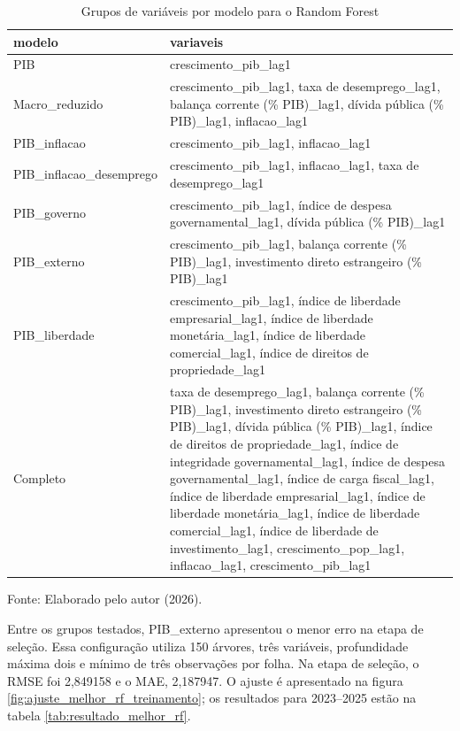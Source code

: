 \begin{table}[htbp]
	\centering
	\captionsetup{justification=centering}
	\caption{Grupos de variáveis por modelo para o Random Forest}
	\label{tab:grupos_rf}
	
	\scriptsize
	\setlength{\tabcolsep}{2pt}
	\renewcommand{\arraystretch}{1.3}
	
	\begin{tabularx}{\textwidth}{>{\RaggedRight\arraybackslash}X>{\RaggedRight\arraybackslash}X}
		\toprule
		modelo & variaveis \\
		\midrule
		PIB & crescimento\_pib\_lag1 \\
		Macro\_reduzido & crescimento\_pib\_lag1, taxa de desemprego\_lag1, balança corrente (\% PIB)\_lag1, dívida pública (\% PIB)\_lag1, inflacao\_lag1 \\
		PIB\_inflacao & crescimento\_pib\_lag1, inflacao\_lag1 \\
		PIB\_inflacao\_desemprego & crescimento\_pib\_lag1, inflacao\_lag1, taxa de desemprego\_lag1 \\
		PIB\_governo & crescimento\_pib\_lag1, índice de despesa governamental\_lag1, dívida pública (\% PIB)\_lag1 \\
		PIB\_externo & crescimento\_pib\_lag1, balança corrente (\% PIB)\_lag1, investimento direto estrangeiro (\% PIB)\_lag1 \\
		PIB\_liberdade & crescimento\_pib\_lag1, índice de liberdade empresarial\_lag1, índice de liberdade monetária\_lag1, índice de liberdade comercial\_lag1, índice de direitos de propriedade\_lag1 \\
		Completo & taxa de desemprego\_lag1, balança corrente (\% PIB)\_lag1, investimento direto estrangeiro (\% PIB)\_lag1, dívida pública (\% PIB)\_lag1, índice de direitos de propriedade\_lag1, índice de integridade governamental\_lag1, índice de despesa governamental\_lag1, índice de carga fiscal\_lag1, índice de liberdade empresarial\_lag1, índice de liberdade monetária\_lag1, índice de liberdade comercial\_lag1, índice de liberdade de investimento\_lag1, crescimento\_pop\_lag1, inflacao\_lag1, crescimento\_pib\_lag1 \\
		\bottomrule
	\end{tabularx}
	
	
	\vspace{0.1cm}
	
	\small Fonte: Elaborado pelo autor (2026).
\end{table}


Entre os grupos testados, PIB\_externo apresentou o menor erro na etapa de seleção. Essa configuração utiliza 150 árvores, três variáveis, profundidade máxima dois e mínimo de três observações por folha. Na etapa de seleção, o RMSE foi 2,849158 e o MAE, 2,187947. O ajuste é apresentado na figura \ref{fig:ajuste_melhor_rf_treinamento}; os resultados para 2023–2025 estão na tabela \ref{tab:resultado_melhor_rf}.


